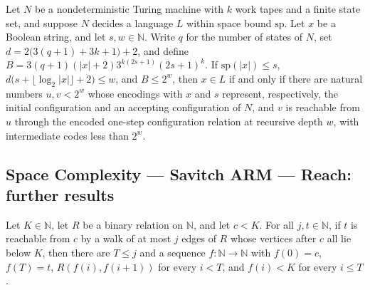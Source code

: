 \begin{theorem}
\label{Complexity.LogProg.SavitchARM.mem_iff_reach}
\leanok
{}
Let $N$ be a nondeterministic Turing machine with $k$ work tapes and a finite state set,
and suppose $N$ decides a language $L$ within space bound $\mathrm{sp}$. Let $x$ be a
Boolean string, and let $s,w\in\mathbb{N}$. Write $q$ for the number of states of $N$,
set $d=2\bigl(3(q+1)+3k+1\bigr)+2$, and define $B=3(q+1)(|x|+2)3^{k(2s+1)}(2s+1)^k$. If
$\mathrm{sp}(|x|)\le s$, $d\bigl(s+\lfloor\log_2|x|\rfloor+2\bigr)\le w$, and $B\le
2^w$, then $x\in L$ if and only if there are natural numbers $u,v<2^w$ whose encodings
with $x$ and $s$ represent, respectively, the initial configuration and an accepting
configuration of $N$, and $v$ is reachable from $u$ through the encoded one-step
configuration relation at recursive depth $w$, with intermediate codes less than $2^w$.
\end{theorem}

\subsection*{Space Complexity --- Savitch ARM --- Reach: further results}

\begin{theorem}
\label{Complexity.LogProg.SavitchARM.chain_of_walkLe}
\leanok
{}
Let $K\in\mathbb{N}$, let $R$ be a binary relation on $\mathbb{N}$, and let $c<K$. For
all $j,t\in\mathbb{N}$, if $t$ is reachable from $c$ by a walk of at most $j$ edges of
$R$ whose vertices after $c$ all lie below $K$, then there are $T\le j$ and a sequence
$f:\mathbb{N}\to\mathbb{N}$ with $f(0)=c$, $f(T)=t$, $R(f(i),f(i+1))$ for every $i<T$,
and $f(i)<K$ for every $i\le T$.
\end{theorem}

